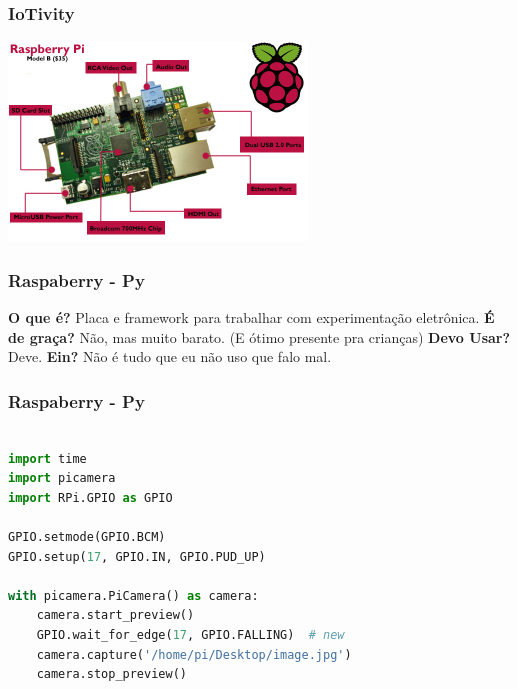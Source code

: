 \documentclass{beamer}
\begin{document}
\begin{frame} \frametitle{ IoTivity }
    \includegraphics[width=300px]{images/raspy}
\end{frame}

\begin{frame} \frametitle{ Raspaberry - Py }
    \textbf{O que é?}
\linebreak
\linebreak
    Placa e framework para trabalhar com experimentação eletrônica.
\linebreak
\linebreak
    \textbf{É de graça?}
\linebreak
\linebreak
    Não, mas muito barato. (E ótimo presente pra crianças)
\linebreak
\linebreak
    \textbf{Devo Usar?}
\linebreak
\linebreak
    Deve.
\linebreak
\linebreak
    \textbf{Ein?}
    \pause
\linebreak
\linebreak
    Não é tudo que eu não uso que falo mal.
\end{frame}

\begin{frame}[fragile] \frametitle{ Raspaberry - Py}
    \begin{lstlisting}[language=Python]

import time
import picamera
import RPi.GPIO as GPIO

GPIO.setmode(GPIO.BCM)
GPIO.setup(17, GPIO.IN, GPIO.PUD_UP)

with picamera.PiCamera() as camera:
    camera.start_preview()
    GPIO.wait_for_edge(17, GPIO.FALLING)  # new
    camera.capture('/home/pi/Desktop/image.jpg')
    camera.stop_preview()

    \end{lstlisting}
\end{frame}
\end{document}
